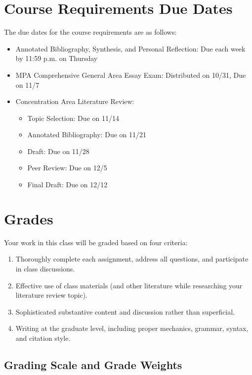 \documentclass[12pt, letterpaper]{article}
\begin{document}
\section{Course Requirements Due Dates}

The due dates for the course requirements are as follows:
    \begin{itemize}
        \item Annotated Bibliography, Synthesis, and Personal Reflection: Due each week by 11:59 p.m. on Thursday
        \item MPA Comprehensive General Area Essay Exam: Distributed on 10/31, Due on 11/7
        \item Concentration Area Literature Review:
        \begin{itemize}
            \item Topic Selection: Due on 11/14
            \item Annotated Bibliography: Due on 11/21
            \item Draft: Due on 11/28
            \item Peer Review: Due on 12/5
            \item Final Draft: Due on 12/12
        \end{itemize}
    \end{itemize}

\section{Grades}

Your work in this class will be graded based on four criteria:
    \begin{enumerate}
        \item Thoroughly complete each assignment, address all questions, and participate in class discussions.
        \item Effective use of class materials (and other literature while researching your literature review topic).
        \item Sophisticated substantive content and discussion rather than superficial.
        \item Writing at the graduate level, including proper mechanics, grammar, syntax, and citation style.
    \end{enumerate}

\subsection*{Grading Scale and Grade Weights}  
\end{document}
